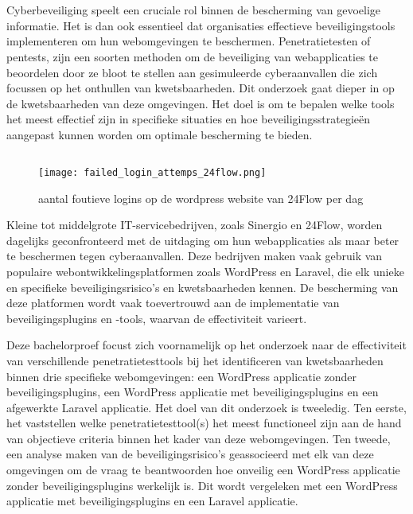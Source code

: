 
\chapter{}%
\label{ch:inleiding}
Cyberbeveiliging speelt een cruciale rol binnen de bescherming van gevoelige informatie. Het is dan ook essentieel dat organisaties 
effectieve beveiligingstools implementeren om hun webomgevingen te beschermen. Penetratietesten of pentests, zijn een 
soorten methoden om de beveiliging van webapplicaties te beoordelen door ze bloot te stellen aan gesimuleerde 
cyberaanvallen die zich focussen op het onthullen van kwetsbaarheden. Dit onderzoek gaat dieper in op de kwetsbaarheden van deze omgevingen. Het doel is om te bepalen welke tools 
het meest effectief zijn in specifieke situaties en hoe beveiligingsstrategieën aangepast kunnen worden om optimale 
bescherming te bieden.



\section{}%
\label{sec:probleemstelling}

\begin{figure}
  \centering
  \texttt{[image: failed\_login\_attemps\_24flow.png]}
  \caption[aantal foutieve logins op de wordpress website van 24Flow per dag ]{aantal foutieve logins op de wordpress website van 24Flow per dag }
\end{figure}
Kleine tot middelgrote IT-servicebedrijven, zoals Sinergio en 24Flow, worden dagelijks geconfronteerd met de uitdaging om hun 
webapplicaties als maar beter te beschermen tegen cyberaanvallen. Deze bedrijven maken vaak gebruik van populaire webontwikkelingsplatformen 
zoals WordPress en Laravel, die elk unieke en specifieke beveiligingsrisico's en kwetsbaarheden kennen. De bescherming van deze platformen 
wordt vaak toevertrouwd aan de implementatie van beveiligingsplugins en -tools, waarvan de effectiviteit varieert.

Deze bachelorproef focust zich voornamelijk op het onderzoek naar de effectiviteit van verschillende penetratietesttools  
bij het identificeren van kwetsbaarheden binnen drie specifieke webomgevingen: een WordPress applicatie zonder beveiligingsplugins,
een WordPress applicatie met beveiligingsplugins en een afgewerkte Laravel applicatie. Het doel van dit onderzoek is tweeledig. 
Ten eerste, het vaststellen welke penetratietesttool(s) het meest functioneel zijn aan de hand van objectieve criteria binnen het kader van deze webomgevingen. Ten tweede, 
een analyse maken van de beveiligingsrisico's geassocieerd met elk van deze omgevingen om de vraag te beantwoorden hoe onveilig een 
WordPress applicatie zonder beveiligingsplugins werkelijk is. Dit wordt vergeleken met een WordPress applicatie met 
beveiligingsplugins en een Laravel applicatie.

